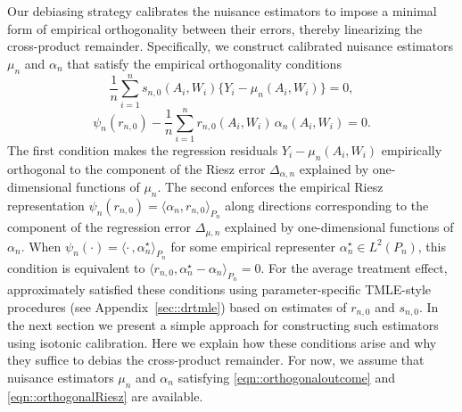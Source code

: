 \documentclass[11pt]{article}
\theoremstyle{plain}
\begin{document}
 


 
 
Our debiasing strategy calibrates the nuisance estimators to impose a minimal form of empirical orthogonality between their errors, thereby linearizing the cross-product remainder. Specifically, we construct calibrated nuisance estimators $\mu_n$ and $\alpha_n$ that satisfy the empirical orthogonality conditions
\begin{equation}
\frac{1}{n}\sum_{i=1}^n s_{n,0}(A_i,W_i)\{Y_i - \mu_n(A_i,W_i)\}
= 0 ,
\label{eqn::orthogonaloutcome}
\end{equation}
\begin{equation}
\psi_n(r_{n,0})
- \frac{1}{n}\sum_{i=1}^n r_{n,0}(A_i, W_i)\,\alpha_n(A_i, W_i)
= 0 .
\label{eqn::orthogonalRiesz}
\end{equation}
 The first condition makes the regression residuals $Y_i-\mu_n(A_i,W_i)$
empirically orthogonal to the component of the Riesz error
$\Delta_{\alpha,n}$ explained by one-dimensional functions of $\mu_n$.
The second enforces the empirical Riesz representation
$\psi_n(r_{n,0})=\langle \alpha_n, r_{n,0}\rangle_{P_n}$ along directions
corresponding to the component of the regression error $\Delta_{\mu,n}$
explained by one-dimensional functions of $\alpha_n$. When
$\psi_n(\cdot)=\langle \cdot\,, \alpha_n^\star\rangle_{P_n}$ for some
empirical representer $\alpha_n^\star\in L^2(P_n)$, this condition is equivalent to
$\langle r_{n,0},\alpha_n^\star-\alpha_n\rangle_{P_n}=0$. For the average treatment effect, \cite{benkeser2017doubly}
approximately satisfied these conditions using parameter-specific
TMLE-style procedures (see Appendix~\ref{sec::drtmle}) based on estimates
of $r_{n,0}$ and $s_{n,0}$. In the next section we present a simple approach for
constructing such estimators using isotonic calibration. Here we explain how
these conditions arise and why they suffice to debias the cross-product remainder. For now, we assume that nuisance estimators $\mu_n$ and $\alpha_n$ satisfying \eqref{eqn::orthogonaloutcome} and \eqref{eqn::orthogonalRiesz} are available.



 

 
\end{document}
